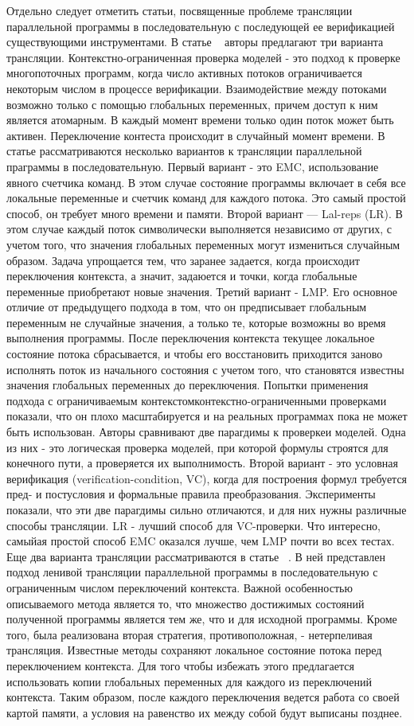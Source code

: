 Отдельно следует отметить статьи, посвященные проблеме трансляции параллельной программы в последовательную с последующей ее верификацией существующими инструментами. В статье ~\cite{Ghafari:2010} авторы предлагают три варианта трансляции.
Контекстно-ограниченная проверка моделей - это подход к проверке многопоточных программ, когда число активных потоков ограничивается некоторым числом в процессе верификации. Взаимодействие между потоками возможно только с помощью глобальных переменных, причем доступ к ним является атомарным. В каждый момент времени только один поток может быть активен. Переключение контеста происходит в случайный момент времени. 
В статье рассматриваются несколько вариантов к трансляции параллельной праграммы в последовательную. 
Первый вариант - это EMC, использование явного счетчика команд. В этом случае состояние программы включает в себя все локальные переменные и счетчик команд для каждого потока. Это самый простой способ, он требует много времени и памяти.
Второй вариант — Lal-reps (LR). В этом случае каждый поток символически выполняется независимо от других, с учетом того, что значения глобальных переменных могут измениться случайным образом. Задача упрощается тем, что заранее задается, когда происходит переключения контекста, а значит, задаюется и точки, когда глобальные переменные приобретают новые значения. 
Третий вариант - LMP. Его основное отличие от предыдущего подхода в том, что он предписывает глобальным переменным не случайные значения, а только те, которые возможны во время выполнения программы. После переключения контекста текущее локальное состояние потока сбрасывается, и чтобы его восстановить приходится заново исполнять поток из начального состояния с учетом того, что становятся известны значения глобальных переменных до переключения.
Попытки применения подхода с ограничиваемым контекстомконтекстно-ограниченными проверками показали, что он плохо масштабируется и на реальных программах пока не может быть использован. Авторы сравнивают две парагдимы к проверкеи моделей. Одна из них - это логическая проверка моделей, при которой формулы строятся для конечного пути, а проверяется их выполнимость. Второй вариант - это условная верификация (verification-condition, VC), когда для построения формул требуется пред- и постусловия и формальные правила преобразования. Эксперименты показали, что эти две парагдимы сильно отличаются, и для них нужны различные способы трансляции. LR - лучший способ для VC-проверки. Что интересно, самыйая простой способ EMC оказался лучше, чем LMP почти во всех тестах.
Еще два варианта трансляции рассматриваются в статье ~\cite{Torre:2009}. В ней представлен подход ленивой трансляции параллельной программы в последовательную с ограниченным числом переключений контекста. Важной особенностью описываемого метода является то, что множество достижимых состояний полученной программы является тем же, что и для исходной программы. Кроме того, была реализована вторая стратегия, противоположная, - нетерпеливая трансляция. Известные методы сохраняют локальное состояние потока перед переключением контекста. Для того чтобы избежать этого предлагается использовать копии глобальных переменных для каждого из переключений контекста. Таким образом, после каждого переключения ведется работа со своей картой памяти, а условия на равенство их между собой будут выписаны позднее. 
